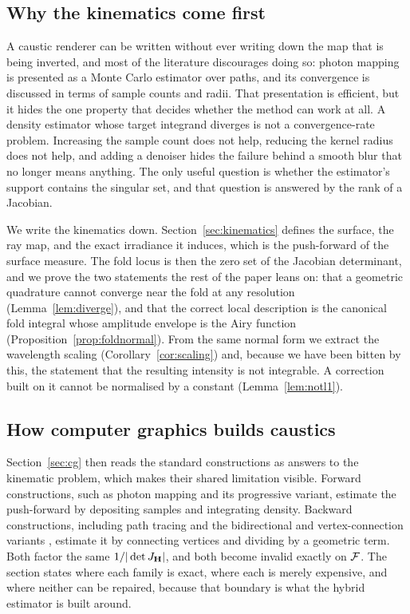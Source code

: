 \subsection{Why the kinematics come first}
\label{sec:why-kinematics}

A caustic renderer can be written without ever writing down the map
that is being inverted, and most of the literature discourages doing so: photon
mapping is presented as a Monte Carlo estimator over paths, and its convergence
is discussed in terms of sample counts and radii. That presentation is
efficient, but it hides the one property that decides whether the method can
work at all. A density estimator whose target integrand diverges is not a
convergence-rate problem. Increasing the sample count does not help, reducing
the kernel radius does not help, and adding a denoiser hides the failure behind
a smooth blur that no longer means anything. The only useful question is
whether the estimator's support contains the singular set, and that question is
answered by the rank of a Jacobian.

We write the kinematics down. Section~\ref{sec:kinematics} defines the
surface, the ray map, and the exact irradiance it induces, which is the
push-forward of the surface measure. The fold locus is then the zero set of the
Jacobian determinant, and we prove the two statements the rest of the paper
leans on: that a geometric quadrature cannot converge near the fold at any
resolution (Lemma~\ref{lem:diverge}), and that the correct local description is
the canonical fold integral whose amplitude envelope is the Airy function
(Proposition~\ref{prop:foldnormal}). From the same normal form we extract the
wavelength scaling (Corollary~\ref{cor:scaling}) and, because we have been
bitten by this, the statement that the resulting intensity is not integrable.
A correction built on it cannot be normalised by a constant
(Lemma~\ref{lem:notl1}).

\subsection{How computer graphics builds caustics}
\label{sec:why-cg}

Section~\ref{sec:cg} then reads the standard constructions as answers to the
kinematic problem, which makes their shared limitation visible. Forward
constructions, such as photon mapping and its progressive variant, estimate the
push-forward by depositing samples and integrating density. Backward
constructions, including path tracing and the bidirectional and vertex-connection
variants \cite{veach1997,muller2017}, estimate it by connecting vertices
and dividing by a geometric term. Both factor the same $1/|\det J_{\mathbf{H}}|$, and both
become invalid exactly on $\mathcal{F}$. The section states where each family is
exact, where each is merely expensive, and where neither can be repaired,
because that boundary is what the hybrid estimator is built around.

